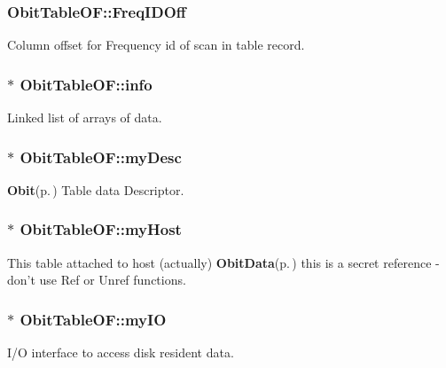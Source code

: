 \subsubsection{ {\bf Obit\-Table\-OF::Freq\-IDOff}}\label{structObitTableOF_o28}


Column offset for Frequency id of scan in table record. 

\subsubsection{$\ast$ {\bf Obit\-Table\-OF::info}}\label{structObitTableOF_o5}


Linked list of arrays of data. 

\subsubsection{$\ast$ {\bf Obit\-Table\-OF::my\-Desc}}\label{structObitTableOF_o8}


{\bf Obit}{\rm (p.\,\pageref{structObit})} Table data Descriptor. 

\subsubsection{$\ast$ {\bf Obit\-Table\-OF::my\-Host}}\label{structObitTableOF_o14}


This table attached to host (actually) {\bf Obit\-Data}{\rm (p.\,\pageref{structObitData})} this is a secret reference - don't use Ref or Unref functions. 

\subsubsection{$\ast$ {\bf Obit\-Table\-OF::my\-IO}}\label{structObitTableOF_o7}


I/O interface to access disk resident data. 

